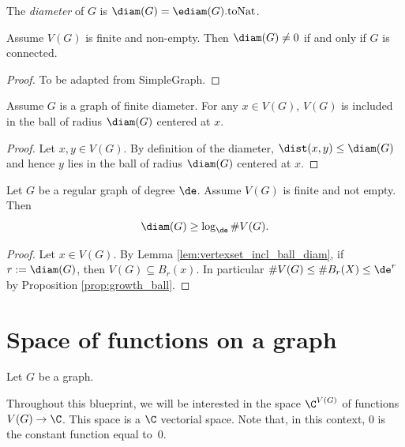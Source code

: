 \begin{definition}
  \label{def:diameter}
  The \emph{diameter} of $G$ is $\diam(G) = \ediam(G).\mathrm{toNat}$.
\end{definition}

\begin{lemma}
  \label{lem:connected_iff_diam_ne_zero}
  Assume $V(G)$ is finite and non-empty. Then $\diam(G) \neq 0$ if and only if
  $G$ is connected.
\end{lemma}
\begin{proof}
  To be adapted from SimpleGraph.
\end{proof}

\begin{lemma}
  \label{lem:vertexset_incl_ball_diam}
  Assume $G$ is a graph of finite diameter.
  For any $x \in V(G)$, $V(G)$ is included in the ball of radius $\diam(G)$
  centered at $x$.
\end{lemma}

\begin{proof}
  Let $x, y \in V(G)$. By definition of the diameter, $\dist(x,y) \leq \diam(G)$
  and hence $y$ lies in the ball of radius $\diam(G)$ centered at $x$.
\end{proof}

\begin{proposition}
  \label{prop:bound_diameter_regular}
  Let $G$ be a regular graph of degree $\de$. Assume $V(G)$ is finite and not empty.
  Then
  \begin{equation}
    \diam(G) \geq \log_{\de} \# V(G).
  \end{equation}
\end{proposition}

\begin{proof}
  Let $x \in V(G)$.
  By Lemma \ref{lem:vertexset_incl_ball_diam}, if $r := \diam(G)$,
  then $V(G) \subseteq B_r(x)$. In particular $\# V(G) \leq \# B_r(X) \leq \de^r$
  by Proposition \ref{prop:growth_ball}.
\end{proof}

\section{Space of functions on a graph}

Let $G$ be a graph.

Throughout this blueprint, we will be interested in the space $\C^{V(G)}$
of functions $V(G) \rightarrow \C$. This space is a $\C$ vectorial space. Note that, in this
context, $0$ is the constant function equal to~$0$.

